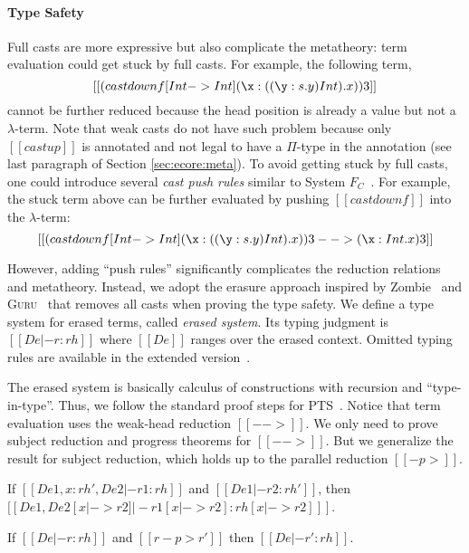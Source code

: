 \paragraph{Type Safety}
Full casts are more expressive but also complicate the
metatheory: term evaluation could get stuck by full casts. For
example, the following term,
\[ [[(castdownf [Int -> Int] (\x:((\y:s.y) Int).x)) 3]]
\]
cannot be further reduced because the head position is already a value
but not a $\lambda$-term.
Note that weak casts do not have such problem because only
$[[castup]]$ is annotated and not legal to have a $\Pi$-type in the
annotation (see last paragraph of Section \ref{sec:ecore:meta}).
To avoid getting stuck by full casts, one could
introduce several \emph{cast push rules} similar to System
$F_C$~\cite{fc}. For example, the stuck term above can be further
evaluated by pushing $[[castdownf]]$ into the $\lambda$-term:
\[
 [[(castdownf [Int -> Int] (\x:((\y:s.y) Int).x)) 3 --> (\x : Int . x) 3]]
\]

However, adding ``push rules'' significantly complicates the reduction
relations and metatheory. Instead, we adopt the erasure approach
inspired by \textsf{Zombie}~\cite{zombie:popl15} and \textsc{Guru}~\cite{guru}
that removes all casts when proving the type safety.
We define a type system for erased
terms, called \emph{erased system}. Its typing judgment is
$[[De |- r : rh]]$ where $[[De]]$ ranges over the erased
context. Omitted typing rules are available in the extended version~\cite{full}.

The erased system is basically calculus of constructions
with recursion and ``type-in-type''. Thus, we follow the standard
proof steps for PTS~\cite{handbook}.
Notice that term evaluation uses the weak-head reduction $[[-->]]$.
We only need to prove subject reduction and
progress theorems for $[[-->]]$. But we generalize the result for
subject reduction, which holds up to the parallel reduction
$[[-p>]]$.

\begin{lemma}\label{lem:full:subst}
  If $[[De1, x:rh', De2 |- r1:rh]]$ and $[[De1 |- r2:rh']]$, then
  $[[De1, De2 [x |-> r2] |- r1[x |-> r2] : rh[x |-> r2] ]]$.
\end{lemma}

\begin{theorem}\label{lem:full:reduct}
  If $[[De |- r:rh]]$ and $[[r -p> r']]$ then $[[De |- r':rh]]$.
\end{theorem}

